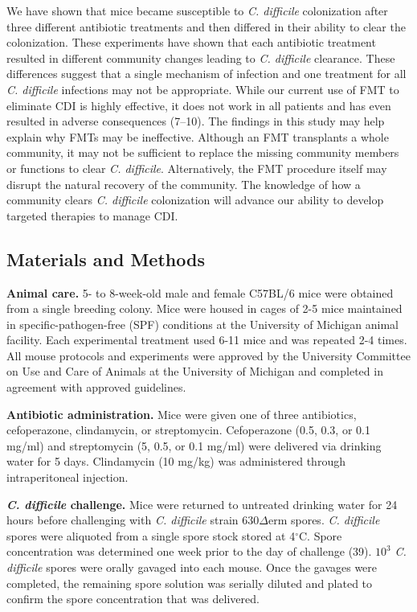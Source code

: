 \documentclass[12pt,]{article}
\begin{document}
We have shown that mice became susceptible to \emph{C. difficile}
colonization after three different antibiotic treatments and then
differed in their ability to clear the colonization. These experiments
have shown that each antibiotic treatment resulted in different
community changes leading to \emph{C. difficile} clearance. These
differences suggest that a single mechanism of infection and one
treatment for all \emph{C. difficile} infections may not be appropriate.
While our current use of FMT to eliminate CDI is highly effective, it
does not work in all patients and has even resulted in adverse
consequences (7--10). The findings in this study may help explain why
FMTs may be ineffective. Although an FMT transplants a whole community,
it may not be sufficient to replace the missing community members or
functions to clear \emph{C. difficile}. Alternatively, the FMT procedure
itself may disrupt the natural recovery of the community. The knowledge
of how a community clears \emph{C. difficile} colonization will advance
our ability to develop targeted therapies to manage CDI.

\hypertarget{materials-and-methods}{%
\subsection{Materials and Methods}\label{materials-and-methods}}

\textbf{Animal care.} 5- to 8-week-old male and female C57BL/6 mice were
obtained from a single breeding colony. Mice were housed in cages of 2-5
mice maintained in specific-pathogen-free (SPF) conditions at the
University of Michigan animal facility. Each experimental treatment used
6-11 mice and was repeated 2-4 times. All mouse protocols and
experiments were approved by the University Committee on Use and Care of
Animals at the University of Michigan and completed in agreement with
approved guidelines.

\textbf{Antibiotic administration.} Mice were given one of three
antibiotics, cefoperazone, clindamycin, or streptomycin. Cefoperazone
(0.5, 0.3, or 0.1 mg/ml) and streptomycin (5, 0.5, or 0.1 mg/ml) were
delivered via drinking water for 5 days. Clindamycin (10 mg/kg) was
administered through intraperitoneal injection.

\textbf{\emph{C. difficile} challenge.} Mice were returned to untreated
drinking water for 24 hours before challenging with \emph{C. difficile}
strain 630\(\Delta\)erm spores. \emph{C. difficile} spores were
aliquoted from a single spore stock stored at 4\(^\circ\)C. Spore
concentration was determined one week prior to the day of challenge
(39). \(10^{3}\) \emph{C. difficile} spores were orally gavaged into
each mouse. Once the gavages were completed, the remaining spore
solution was serially diluted and plated to confirm the spore
concentration that was delivered.
\end{document}
